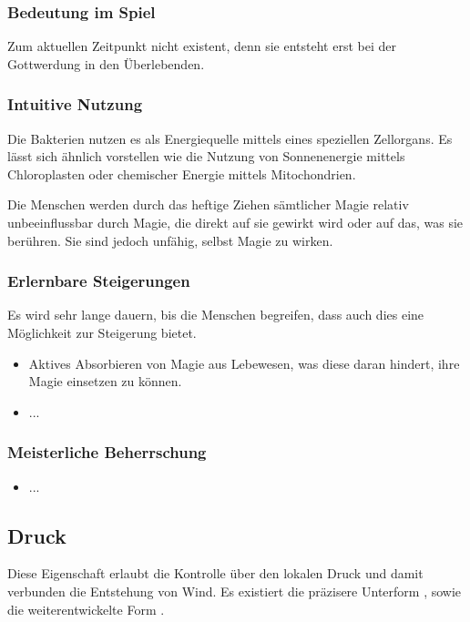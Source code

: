 \subsubsection{Bedeutung im Spiel}
Zum aktuellen Zeitpunkt nicht existent, denn sie entsteht erst bei der Gottwerdung in den Überlebenden.

\subsubsection{Intuitive Nutzung}
Die Bakterien nutzen es als Energiequelle mittels eines speziellen Zellorgans. Es lässt sich ähnlich vorstellen wie die Nutzung von Sonnenenergie mittels Chloroplasten oder chemischer Energie mittels Mitochondrien. 

Die Menschen werden durch das heftige Ziehen sämtlicher Magie relativ unbeeinflussbar durch Magie, die direkt auf sie gewirkt wird oder auf das, was sie berühren. Sie sind jedoch unfähig, selbst Magie zu wirken.

\subsubsection{Erlernbare Steigerungen}
Es wird sehr lange dauern, bis die Menschen begreifen, dass auch dies eine Möglichkeit zur Steigerung bietet.
\begin{itemize}
	\item Aktives Absorbieren von Magie aus Lebewesen, was diese daran hindert, ihre Magie einsetzen zu können.
	\item ...
\end{itemize}

\subsubsection{Meisterliche Beherrschung} 
\begin{itemize}
	\item ...
\end{itemize}




\subsection{Druck}\label{sec:druckmagie}
Diese Eigenschaft erlaubt die Kontrolle über den lokalen Druck und damit verbunden die Entstehung von Wind. Es existiert die präzisere Unterform , sowie die weiterentwickelte Form .

